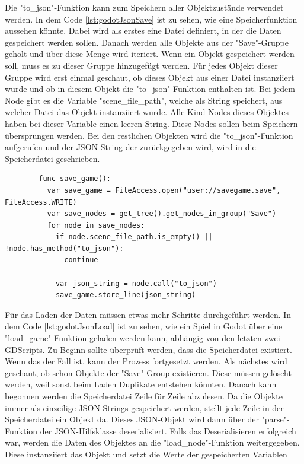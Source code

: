 Die "to\_json"-Funktion kann zum Speichern aller Objektzustände verwendet werden. In dem Code \ref{lst:godotJsonSave} ist zu sehen, wie eine Speicherfunktion aussehen könnte. Dabei wird als erstes eine Datei definiert, in der die Daten gespeichert werden sollen. Danach werden alle Objekte aus der "Save"-Gruppe geholt und über diese Menge wird iteriert. Wenn ein Objekt gespeichert werden soll, muss es zu dieser Gruppe hinzugefügt werden. Für jedes Objekt dieser Gruppe wird erst einmal geschaut, ob dieses Objekt aus einer Datei instanziiert wurde und ob in diesem Objekt die "to\_json"-Funktion enthalten ist. Bei jedem Node gibt es die Variable "scene\_file\_path", welche als String speichert, aus welcher Datei das Objekt instanziiert wurde. Alle Kind-Nodes dieses Objektes haben bei dieser Variable einen leeren String.\cite{godotengineNode} Diese Nodes sollen beim Speichern übersprungen werden. Bei den restlichen Objekten wird die "to\_json"-Funktion aufgerufen und der JSON-String der zurückgegeben wird, wird in die Speicherdatei geschrieben.\cite{godotengineSavingGames}

\begin{listing}[htp]
    \begin{verbatim}
        func save_game():
          var save_game = FileAccess.open("user://savegame.save", FileAccess.WRITE)
          var save_nodes = get_tree().get_nodes_in_group("Save")
          for node in save_nodes:
            if node.scene_file_path.is_empty() || !node.has_method("to_json"): 
              continue 

            var json_string = node.call("to_json")
            save_game.store_line(json_string)
    \end{verbatim}
    \caption{Beispiel für das Speichern mit JSON in Godot\cite{godotengineSavingGames}}
    \label{lst:godotJsonSave}
\end{listing}

Für das Laden der Daten müssen etwas mehr Schritte durchgeführt werden. In dem Code \ref{lst:godotJsonLoad} ist zu sehen, wie ein Spiel in Godot über eine "load\_game"-Funktion geladen werden kann, abhängig von den letzten zwei GDScripts. Zu Beginn sollte überprüft werden, dass die Speicherdatei existiert. Wenn das der Fall ist, kann der Prozess fortgesetzt werden. Als nächstes wird geschaut, ob schon Objekte der "Save"-Group existieren. Diese müssen gelöscht werden, weil sonst beim Laden Duplikate entstehen könnten. Danach kann begonnen werden die Speicherdatei Zeile für Zeile abzulesen. Da die Objekte immer als einzeilige JSON-Strings gespeichert werden, stellt jede Zeile in der Speicherdatei ein Objekt da. Dieses JSON-Objekt wird dann über der "parse"-Funktion der JSON-Hilfsklasse deserialisiert. Falls das Deserialisieren erfolgreich war, werden die Daten des Objektes an die "load\_node"-Funktion weitergegeben. Diese instanziiert das Objekt und setzt die Werte der gespeicherten Variablen\cite{godotengineSavingGames}

